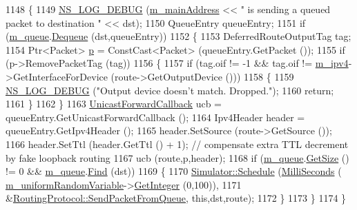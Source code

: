 \begin{DoxyCode}
1148 \{
1149   \hyperlink{group__logging_ga413f1886406d49f59a6a0a89b77b4d0a}{NS\_LOG\_DEBUG} (\hyperlink{classns3_1_1dsdv_1_1RoutingProtocol_af7cb076b88eb5ff20a1c146e3f5849f6}{m\_mainAddress} << \textcolor{stringliteral}{" is sending a queued packet to destination "} << 
      dst);
1150   QueueEntry queueEntry;
1151   \textcolor{keywordflow}{if} (\hyperlink{classns3_1_1dsdv_1_1RoutingProtocol_a3ed623ade7d7244ed1ff5e0f6a399a68}{m\_queue}.\hyperlink{classns3_1_1dsdv_1_1PacketQueue_a3eea5dcab62c438f2eb7d48e33869284}{Dequeue} (dst,queueEntry))
1152     \{
1153       DeferredRouteOutputTag tag;
1154       Ptr<Packet> \hyperlink{lte__link__budget_8m_ac9de518908a968428863f829398a4e62}{p} = ConstCast<Packet> (queueEntry.GetPacket ());
1155       \textcolor{keywordflow}{if} (p->RemovePacketTag (tag))
1156         \{
1157           \textcolor{keywordflow}{if} (tag.oif != -1 && tag.oif != \hyperlink{classns3_1_1dsdv_1_1RoutingProtocol_a955477c7f38e64762a264c24e3762af6}{m\_ipv4}->GetInterfaceForDevice (route->GetOutputDevice ()))
1158             \{
1159               \hyperlink{group__logging_ga413f1886406d49f59a6a0a89b77b4d0a}{NS\_LOG\_DEBUG} (\textcolor{stringliteral}{"Output device doesn't match. Dropped."});
1160               \textcolor{keywordflow}{return};
1161             \}
1162         \}
1163       \hyperlink{classns3_1_1Ipv4RoutingProtocol_a3453a85764cbbb1e704da7e919aa5d19}{UnicastForwardCallback} ucb = queueEntry.GetUnicastForwardCallback ();
1164       Ipv4Header header = queueEntry.GetIpv4Header ();
1165       header.SetSource (route->GetSource ());
1166       header.SetTtl (header.GetTtl () + 1); \textcolor{comment}{// compensate extra TTL decrement by fake loopback routing}
1167       ucb (route,p,header);
1168       \textcolor{keywordflow}{if} (\hyperlink{classns3_1_1dsdv_1_1RoutingProtocol_a3ed623ade7d7244ed1ff5e0f6a399a68}{m\_queue}.\hyperlink{classns3_1_1dsdv_1_1PacketQueue_a750099896a013a01a1c1093db34808bb}{GetSize} () != 0 && \hyperlink{classns3_1_1dsdv_1_1RoutingProtocol_a3ed623ade7d7244ed1ff5e0f6a399a68}{m\_queue}.\hyperlink{classns3_1_1dsdv_1_1PacketQueue_a13a16f813e0f9a67b2ab4ee3b1f10c70}{Find} (dst))
1169         \{
1170           \hyperlink{classns3_1_1Simulator_a671882c894a08af4a5e91181bf1eec13}{Simulator::Schedule} (\hyperlink{group__timecivil_gaf26127cf4571146b83a92ee18679c7a9}{MilliSeconds} (
      \hyperlink{classns3_1_1dsdv_1_1RoutingProtocol_a2d5efde0680b47457d0b94d0493c9eec}{m\_uniformRandomVariable}->\hyperlink{classns3_1_1RandomVariableStream_a66cd94e6305ce7f000f1a9ff0fcb9aef}{GetInteger} (0,100)),
1171                                &\hyperlink{classns3_1_1dsdv_1_1RoutingProtocol_a9359912928dc5b8dc851366a78c0cc8c}{RoutingProtocol::SendPacketFromQueue},\textcolor{keyword}{
      this},dst,route);
1172         \}
1173     \}
1174 \}
\end{DoxyCode}


